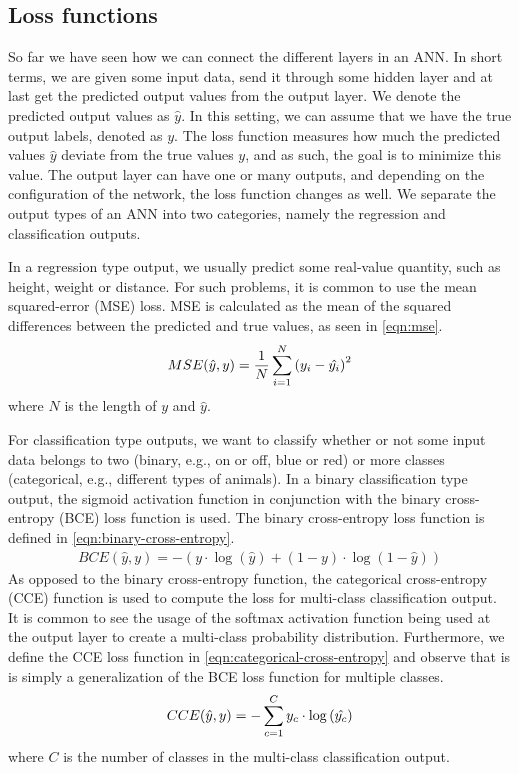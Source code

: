 \subsection{Loss functions}
\label{sec:loss-functions-ann}
So far we have seen how we can connect the different layers in an ANN. In short terms, we are given some input data, send it through some hidden layer and at last get the predicted output values from the output layer. We denote the predicted output values as $\hat{y}$. In this setting, we can assume that we have the true output labels, denoted as $y$. The loss function measures how much the predicted values $\hat{y}$ deviate from the true values $y$, and as such, the goal is to minimize this value. The output layer can have one or many outputs, and depending on the configuration of the network, the loss function changes as well. We separate the output types of an ANN into two categories, namely the regression and classification outputs.

In a regression type output, we usually predict some real-value quantity, such as height, weight or distance. For such problems, it is common to use the mean squared-error (MSE) loss. MSE is calculated as the mean of the squared differences between the predicted and true values, as seen in \cref{eqn:mse}.
\begin{align}
    \label{eqn:mse}
    MSE(\hat{y}, y) = \frac{1}{N} \sum\limits_{i=1}^{N} {\left( y_i - \hat{y_i} \right)}^2
\end{align}
where $N$ is the length of $y$ and $\hat{y}$.

For classification type outputs, we want to classify whether or not some input data belongs to two (binary, e.g., on or off, blue or red) or more classes (categorical, e.g., different types of animals). In a binary classification type output, the sigmoid activation function in conjunction with the binary cross-entropy (BCE) loss function is used. The binary cross-entropy loss function is defined in \cref{eqn:binary-cross-entropy}.
\begin{align}
    \label{eqn:binary-cross-entropy}
    BCE(\hat{y}, y) = -\left( y \cdot \log{\left( \hat{y} \right)} + (1 - y) \cdot \log{\left( 1 - \hat{y} \right)} \right)
\end{align}
As opposed to the binary cross-entropy function, the categorical cross-entropy (CCE) function is used to compute the loss for multi-class classification output. It is common to see the usage of the softmax activation function being used at the output layer to create a multi-class probability distribution. Furthermore, we define the CCE loss function in \cref{eqn:categorical-cross-entropy} and observe that is is simply a generalization of the BCE loss function for multiple classes.
\begin{align}
    \label{eqn:categorical-cross-entropy}
    CCE(\hat{y}, y) = -\sum\limits_{c=1}^{C} y_c \cdot \log{\left( \hat{y_c} \right)}
\end{align}
where $C$ is the number of classes in the multi-class classification output.

